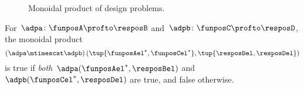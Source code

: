 \begin{figure}[h!]
    \begin{center}
    \end{center}
    \caption{Monoidal product of design problems. \label{fig:dpmonoidal}}
\end{figure}


\begin{remark}
    For~$\adpa \colon \funposA\profto \resposB$ and~$\adpb \colon \funposC \profto \resposD$, the monoidal product
    \begin{equation}
        \left(\adpa \mtimescat \adpb\right)(\tup{\funposAel^*, \funposCel^*}, \tup{\resposBel,\resposDel})
    \end{equation}
    is true if \emph{both}~$\adpa(\funposAel^*,\resposBel)$ and~$\adpb(\funposCel^*,\resposDel)$ are true, and false otherwise.
\end{remark}

